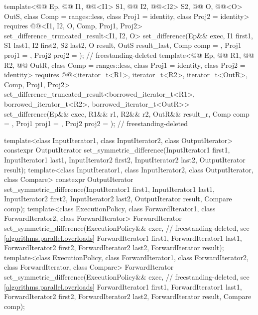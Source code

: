 \begin{codeblock}
{{    template<@@ Ep, @@ I1, @@<I1> S1,
             @@ I2, @@<I2> S2,
             @@ O, @@<O> OutS, class Comp = ranges::less,
             class Proj1 = identity, class Proj2 = identity>
      requires @@<I1, I2, O, Comp, Proj1, Proj2>
      set_difference_truncated_result<I1, I2, O>
        set_difference(Ep&& exec, I1 first1, S1 last1, I2 first2, S2 last2,
                       O result, OutS result_last, Comp comp = {}, Proj1 proj1 = {},
                       Proj2 proj2 = {});                       // freestanding-deleted
    template<@@ Ep, @@ R1, @@ R2,
             @@ OutR, class Comp = ranges::less,
             class Proj1 = identity, class Proj2 = identity>
      requires @@<iterator_t<R1>, iterator_t<R2>, iterator_t<OutR>, Comp, Proj1, Proj2>
      set_difference_truncated_result<borrowed_iterator_t<R1>, borrowed_iterator_t<R2>,
                                      borrowed_iterator_t<OutR>>
        set_difference(Ep&& exec, R1&& r1, R2&& r2, OutR&& result_r, Comp comp = {},
                       Proj1 proj1 = {}, Proj2 proj2 = {});     // freestanding-deleted
  }

  template<class InputIterator1, class InputIterator2, class OutputIterator>
    constexpr OutputIterator
      set_symmetric_difference(InputIterator1 first1, InputIterator1 last1,
                               InputIterator2 first2, InputIterator2 last2,
                               OutputIterator result);
  template<class InputIterator1, class InputIterator2, class OutputIterator, class Compare>
    constexpr OutputIterator
      set_symmetric_difference(InputIterator1 first1, InputIterator1 last1,
                               InputIterator2 first2, InputIterator2 last2,
                               OutputIterator result, Compare comp);
  template<class ExecutionPolicy, class ForwardIterator1, class ForwardIterator2,
           class ForwardIterator>
    ForwardIterator
      set_symmetric_difference(ExecutionPolicy&& exec,          // freestanding-deleted, see \ref{algorithms.parallel.overloads}
                               ForwardIterator1 first1, ForwardIterator1 last1,
                               ForwardIterator2 first2, ForwardIterator2 last2,
                               ForwardIterator result);
  template<class ExecutionPolicy, class ForwardIterator1, class ForwardIterator2,
           class ForwardIterator, class Compare>
    ForwardIterator
      set_symmetric_difference(ExecutionPolicy&& exec,          // freestanding-deleted, see \ref{algorithms.parallel.overloads}
                               ForwardIterator1 first1, ForwardIterator1 last1,
                               ForwardIterator2 first2, ForwardIterator2 last2,
                               ForwardIterator result, Compare comp);

}
\end{codeblock}
